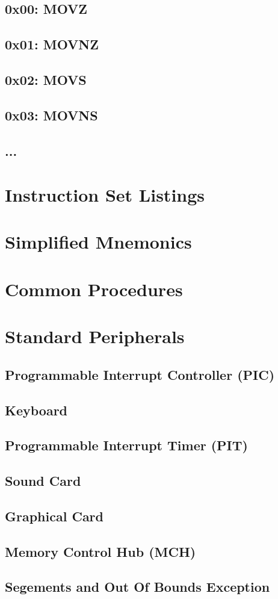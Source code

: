 \documentclass[oneside, a4paper]{memoir}
\begin{document}
\section*{0x00: MOVZ}
\section*{0x01: MOVNZ}
\section*{0x02: MOVS}
\section*{0x03: MOVNS}
\section*{...}

\appendix
\chapter{Instruction Set Listings}

\chapter{Simplified Mnemonics}

\chapter{Common Procedures}

\chapter{Standard Peripherals}
\section{Programmable Interrupt Controller (PIC)}
\section{Keyboard}
\section{Programmable Interrupt Timer (PIT)}
\section{Sound Card}
\section{Graphical Card}
\section{Memory Control Hub (MCH)}
\section{Segements and Out Of Bounds Exception}
\end{document}
